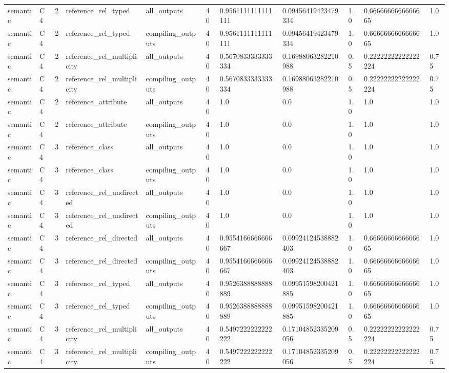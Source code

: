 \begin{tabular}{lllllllllll}
semantic & C4 & 2 & reference\_rel\_typed & all\_outputs & 40 & 0.9561111111111111 & 0.09456419423479334 & 1.0 & 0.6666666666666665 & 1.0 \\
semantic & C4 & 2 & reference\_rel\_typed & compiling\_outputs & 40 & 0.9561111111111111 & 0.09456419423479334 & 1.0 & 0.6666666666666665 & 1.0 \\
semantic & C4 & 2 & reference\_rel\_multiplicity & all\_outputs & 40 & 0.5670833333333334 & 0.16988063282210988 & 0.5 & 0.22222222222222224 & 0.75 \\
semantic & C4 & 2 & reference\_rel\_multiplicity & compiling\_outputs & 40 & 0.5670833333333334 & 0.16988063282210988 & 0.5 & 0.22222222222222224 & 0.75 \\
semantic & C4 & 2 & reference\_attribute & all\_outputs & 40 & 1.0 & 0.0 & 1.0 & 1.0 & 1.0 \\
semantic & C4 & 2 & reference\_attribute & compiling\_outputs & 40 & 1.0 & 0.0 & 1.0 & 1.0 & 1.0 \\
semantic & C4 & 3 & reference\_class & all\_outputs & 40 & 1.0 & 0.0 & 1.0 & 1.0 & 1.0 \\
semantic & C4 & 3 & reference\_class & compiling\_outputs & 40 & 1.0 & 0.0 & 1.0 & 1.0 & 1.0 \\
semantic & C4 & 3 & reference\_rel\_undirected & all\_outputs & 40 & 1.0 & 0.0 & 1.0 & 1.0 & 1.0 \\
semantic & C4 & 3 & reference\_rel\_undirected & compiling\_outputs & 40 & 1.0 & 0.0 & 1.0 & 1.0 & 1.0 \\
semantic & C4 & 3 & reference\_rel\_directed & all\_outputs & 40 & 0.9554166666666667 & 0.09924124538882403 & 1.0 & 0.6666666666666665 & 1.0 \\
semantic & C4 & 3 & reference\_rel\_directed & compiling\_outputs & 40 & 0.9554166666666667 & 0.09924124538882403 & 1.0 & 0.6666666666666665 & 1.0 \\
semantic & C4 & 3 & reference\_rel\_typed & all\_outputs & 40 & 0.9526388888888889 & 0.09951598200421885 & 1.0 & 0.6666666666666665 & 1.0 \\
semantic & C4 & 3 & reference\_rel\_typed & compiling\_outputs & 40 & 0.9526388888888889 & 0.09951598200421885 & 1.0 & 0.6666666666666665 & 1.0 \\
semantic & C4 & 3 & reference\_rel\_multiplicity & all\_outputs & 40 & 0.5497222222222222 & 0.17104852335209056 & 0.5 & 0.22222222222222224 & 0.75 \\
semantic & C4 & 3 & reference\_rel\_multiplicity & compiling\_outputs & 40 & 0.5497222222222222 & 0.17104852335209056 & 0.5 & 0.22222222222222224 & 0.75 \\

\end{tabular}
